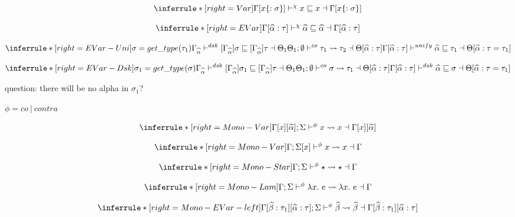 \[
\inferrule*[right=Var]
{ }
{\Gamma[x\{:\sigma\}] \dskunify x \sqsubseteq x \dashv \Gamma[x\{:\sigma\}] }
\]


\newpage


\newcommand{\co}[0]{\vdash^{co}}
\newcommand{\contra}[0]{\vdash^{contra}}
\newcommand{\cocontra}[0]{\vdash^{\phi}}
\newcommand{\bemono}[0]{\leadsto}

\[
\inferrule*[right=EVar]
{ }
{\Gamma[\genA:\tau] \dskunify \genA \sqsubseteq \genA \dashv \Gamma[\genA:\tau] }
\]

\[
\inferrule*[right=EVar-Uni]
{
\sigma =  get\_type(\tau_1)\\
\Gamma_{\genA} \dsk[\Gamma_{\genA}] \sigma \sqsubseteq [ \Gamma_{\genA} ]\tau \dashv \Theta_1\\
\Theta_1; \emptyset \co \tau_1 \bemono \tau_2 \dashv \Theta[\genA:\tau]
}
{\Gamma[\genA:\tau] \unify \genA \sqsubseteq \tau_1 \dashv \Theta[\genA:\tau=\tau_1]}
\]

\[
\inferrule*[right=EVar-Dsk]
{
\sigma_1 =  get\_type(\sigma)\\
\Gamma_{\genA} \dsk[\Gamma_{\genA}] \sigma_1 \sqsubseteq [ \Gamma_{\genA} ]\tau \dashv \Theta_1\\
\Theta_1; \emptyset \co \sigma \bemono \tau_1 \dashv \Theta[\genA:\tau]
}
{ \Gamma[\genA:\tau] \dsk \genA \sqsubseteq \sigma \dashv \Theta[\genA:\tau = \tau_1] }
\]

question: there will be no alpha in $\sigma_1$?

\framebox{$\Gamma[\alpha:\tau]; \Sigma \cocontra \sigma \bemono \tau \dashv \Theta$} $\phi = co~|~contra$

\[
\inferrule*[right=Mono-Var]
{ }
{\Gamma[x][\genA]; \Sigma \cocontra x \bemono x \dashv \Gamma[x][\genA]}
\]

\[
\inferrule*[right=Mono-Var]
{ }
{\Gamma; \Sigma[x] \cocontra x \bemono x \dashv \Gamma}
\]

\[
\inferrule*[right=Mono-Star]
{ }
{\Gamma; \Sigma \cocontra \star \bemono \star \dashv \Gamma }
\]

\[
\inferrule*[right=Mono-Lam]
{ }
{\Gamma; \Sigma \cocontra \lambda x.\ e \bemono \lambda x.\ e \dashv \Gamma}
\]

\[
\inferrule*[right=Mono-EVar-left]
{ }
{\Gamma[\genB:\tau_1][\genA:\tau]; \Sigma \cocontra \genB \bemono \genB \dashv \Gamma[\genB:\tau_1][\genA:\tau]}
\]

